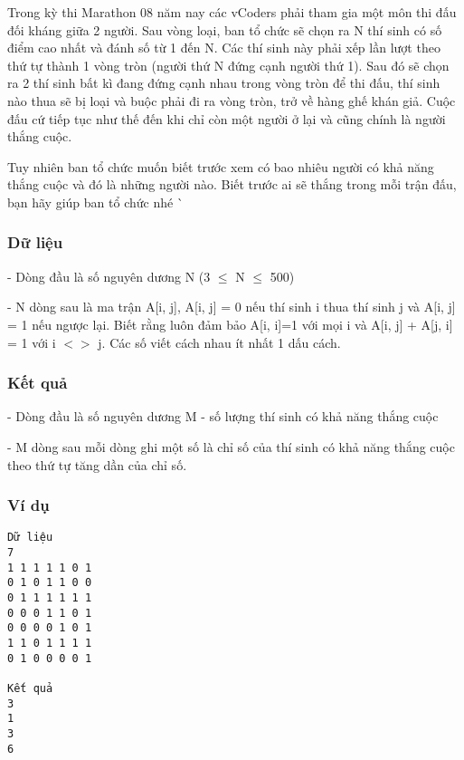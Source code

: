 



   Trong kỳ thi Marathon 08 năm nay các vCoders phải tham gia một môn thi đấu đối kháng giữa 2 người. Sau vòng loại, ban tổ chức sẽ chọn ra N thí sinh có số điểm cao nhất và đánh số từ 1 đến N. Các thí sinh này phải xếp lần lượt theo thứ tự thành 1 vòng tròn (người thứ N đứng cạnh người thứ 1). Sau đó sẽ chọn ra 2 thí sinh bất kì đang đứng cạnh nhau trong vòng tròn để thi đấu, thí sinh nào thua sẽ bị loại và buộc phải đi ra vòng tròn, trở về hàng ghế khán giả. Cuộc đấu cứ tiếp tục như thế đến khi chỉ còn một người ở lại và cũng chính là người thắng cuộc.  

   Tuy nhiên ban tổ chức muốn biết trước xem có bao nhiêu người có khả năng thắng cuộc và đó là những người nào. Biết trước ai sẽ thắng trong mỗi trận đấu, bạn hãy giúp ban tổ chức nhé ^^  

\subsubsection{   Dữ liệu  }

   - Dòng đầu là số nguyên dương N (3  $\le$  N  $\le$  500)   


   - N dòng sau là ma trận A[i, j], A[i, j] = 0 nếu thí sinh i thua thí sinh j và A[i, j] = 1 nếu ngược lại. Biết rằng luôn đảm bảo A[i, i]=1 với mọi i và A[i, j] + A[j, i] = 1 với i $<$$>$ j. Các số viết cách nhau ít nhất 1 dấu cách.  

\subsubsection{   Kết quả  }

   - Dòng đầu là số nguyên dương M - số lượng thí sinh có khả năng thắng cuộc   


   - M dòng sau mỗi dòng ghi một số là chỉ số của thí sinh có khả năng thắng cuộc theo thứ tự tăng dần của chỉ số.  

\subsubsection{   Ví dụ  }
\begin{verbatim}
Dữ liệu
7
1 1 1 1 1 0 1
0 1 0 1 1 0 0
0 1 1 1 1 1 1
0 0 0 1 1 0 1
0 0 0 0 1 0 1
1 1 0 1 1 1 1
0 1 0 0 0 0 1

Kết quả
3
1
3
6
\end{verbatim}
